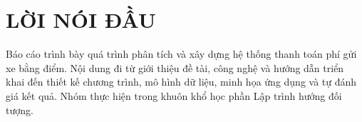 \chapter*{LỜI NÓI ĐẦU}
Báo cáo trình bày quá trình phân tích và xây dựng hệ thống thanh toán phí gửi xe bằng điểm. Nội dung đi từ giới thiệu đề tài, công nghệ và hướng dẫn triển khai đến thiết kế chương trình, mô hình dữ liệu, minh họa ứng dụng và tự đánh giá kết quả. Nhóm thực hiện trong khuôn khổ học phần Lập trình hướng đối tượng.
